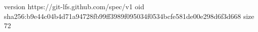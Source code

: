 version https://git-lfs.github.com/spec/v1
oid sha256:b9e44c04b4d71a94728fb99ff3989f095034f0534bcfe581de00e298d6f3d668
size 72
